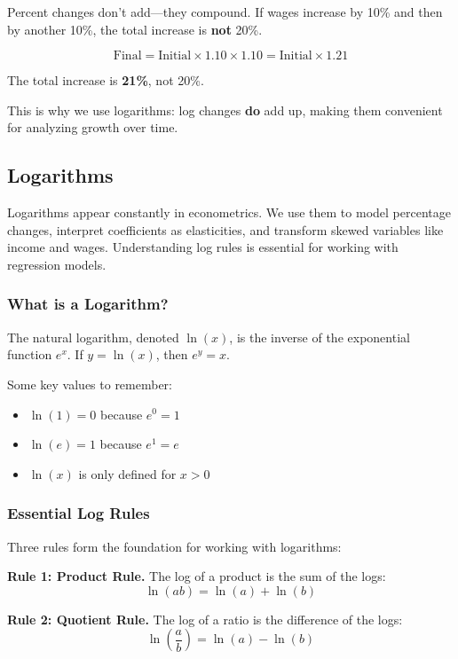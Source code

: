 \documentclass[
  letterpaper,
  DIV=11,
  numbers=noendperiod]{scrreprt}
\providecommand{\tightlist}{%
  \setlength{\itemsep}{0pt}\setlength{\parskip}{0pt}}
\begin{document}
Percent changes don't add---they compound. If wages increase by 10\% and
then by another 10\%, the total increase is \textbf{not} 20\%.

\[\text{Final} = \text{Initial} \times 1.10 \times 1.10 = \text{Initial} \times 1.21\]

The total increase is \textbf{21\%}, not 20\%.

This is why we use logarithms: log changes \textbf{do} add up, making
them convenient for analyzing growth over time.

\subsection{Logarithms}\label{logarithms}

Logarithms appear constantly in econometrics. We use them to model
percentage changes, interpret coefficients as elasticities, and
transform skewed variables like income and wages. Understanding log
rules is essential for working with regression models.

\subsubsection{What is a Logarithm?}\label{what-is-a-logarithm}

The natural logarithm, denoted \(\ln(x)\), is the inverse of the
exponential function \(e^x\). If \(y = \ln(x)\), then \(e^y = x\).

Some key values to remember:

\begin{itemize}
\tightlist
\item
  \(\ln(1) = 0\) because \(e^0 = 1\)
\item
  \(\ln(e) = 1\) because \(e^1 = e\)
\item
  \(\ln(x)\) is only defined for \(x > 0\)
\end{itemize}

\subsubsection{Essential Log Rules}\label{essential-log-rules}

Three rules form the foundation for working with logarithms:

\textbf{Rule 1: Product Rule.} The log of a product is the sum of the
logs: \[\ln(ab) = \ln(a) + \ln(b)\]

\textbf{Rule 2: Quotient Rule.} The log of a ratio is the difference of
the logs: \[\ln\left(\frac{a}{b}\right) = \ln(a) - \ln(b)\]
\end{document}
